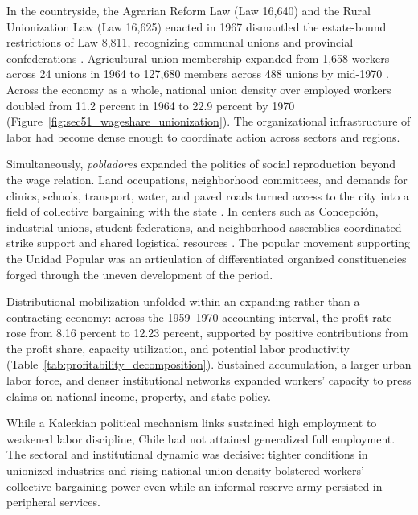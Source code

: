 In the countryside, the Agrarian Reform Law (Law 16,640) and the Rural Unionization Law (Law 16,625) enacted in 1967 dismantled the estate-bound restrictions of Law 8,811, recognizing communal unions and provincial confederations \citep{Chile1967}. Agricultural union membership expanded from 1,658 workers across 24 unions in 1964 to 127,680 members across 488 unions by mid-1970 \citep{DeVylder1976}. Across the economy as a whole, national union density over employed workers doubled from 11.2 percent in 1964 to 22.9 percent by 1970 \citep{OsorioPolanco2021} (Figure~\ref{fig:sec51_wageshare_unionization}). The organizational infrastructure of labor had become dense enough to coordinate action across sectors and regions.

Simultaneously, \emph{pobladores} expanded the politics of social reproduction beyond the wage relation. Land occupations, neighborhood committees, and demands for clinics, schools, transport, water, and paved roads turned access to the city into a field of collective bargaining with the state \citep{Garces2002,Murphy2015}. In centers such as Concepci\'on, industrial unions, student federations, and neighborhood assemblies coordinated strike support and shared logistical resources \citep{Schlotterbeck2018}. The popular movement supporting the Unidad Popular was an articulation of differentiated organized constituencies forged through the uneven development of the period.

Distributional mobilization unfolded within an expanding rather than a contracting economy: across the 1959--1970 accounting interval, the profit rate rose from 8.16 percent to 12.23 percent, supported by positive contributions from the profit share, capacity utilization, and potential labor productivity (Table~\ref{tab:profitability_decomposition}). Sustained accumulation, a larger urban labor force, and denser institutional networks expanded workers' capacity to press claims on national income, property, and state policy.

While a Kaleckian political mechanism links sustained high employment to weakened labor discipline, Chile had not attained generalized full employment. The sectoral and institutional dynamic was decisive: tighter conditions in unionized industries and rising national union density bolstered workers' collective bargaining power even while an informal reserve army persisted in peripheral services.

